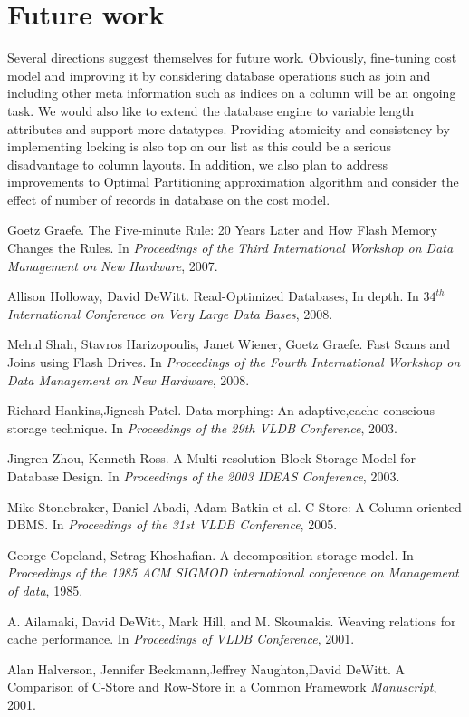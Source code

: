 \documentclass[twocolumn,11pt]{article}
\begin{document}
\section{Future work}
Several directions suggest themselves for future work. Obviously, fine-tuning cost model 
and improving it by considering database operations such as join and including other meta 
information such as indices on a column will be an ongoing task. We would also like to 
extend the database engine to variable length attributes and support more datatypes. 
Providing atomicity and consistency by implementing locking is also top on our list as 
this could be a serious disadvantage to column layouts. In addition, we also plan to 
address improvements to Optimal Partitioning approximation algorithm and consider the 
effect of number of records in database on the cost model.

\begin{thebibliography}{9999999}

 Goetz Graefe.
	The Five-minute Rule: 20 Years Later and How Flash Memory Changes the Rules.
	In {\em Proceedings of the Third International Workshop on Data Management on New Hardware}, 2007.
	
 Allison Holloway, David DeWitt.
	Read-Optimized Databases, In depth.
	In {\em $34^{th}$ International Conference on Very Large Data Bases}, 2008.

 Mehul Shah, Stavros Harizopoulis, Janet Wiener, Goetz Graefe.
	Fast Scans and Joins using Flash Drives.
	In {\em Proceedings of the Fourth International Workshop on Data Management on New Hardware}, 2008.

	Richard Hankins,Jignesh Patel.
	Data morphing: An adaptive,cache-conscious storage technique.
	In {\em Proceedings of the 29th VLDB Conference}, 2003.
	
	Jingren Zhou, Kenneth Ross.
	A Multi-resolution Block Storage Model for Database Design.
	In {\em Proceedings of the 2003 IDEAS Conference}, 2003.

	Mike Stonebraker, Daniel Abadi, Adam Batkin et al.
	C-Store: A Column-oriented DBMS.
	In {\em Proceedings of the 31st VLDB Conference}, 2005.

	George Copeland, Setrag Khoshafian.
	A decomposition storage model.
	In {\em Proceedings of the 1985 ACM SIGMOD international conference on Management of data}, 1985.

	A. Ailamaki, David DeWitt, Mark Hill, and M. Skounakis.
	Weaving relations for cache performance.
	In {\em Proceedings of VLDB Conference}, 2001.

	Alan Halverson, Jennifer Beckmann,Jeffrey Naughton,David DeWitt.
	A Comparison of C-Store and Row-Store in a Common Framework
	{\em Manuscript}, 2001.

\end{thebibliography}
\end{document}
